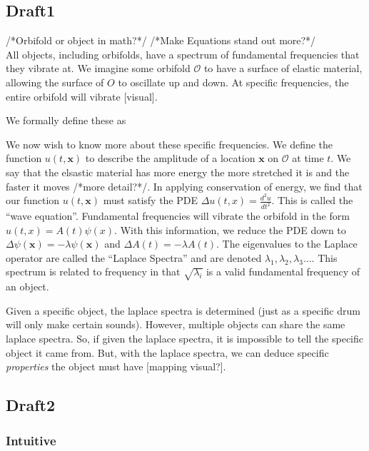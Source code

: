 \documentclass{article}
\begin{document}
\subsection{Draft1}
/*Orbifold or object in math?*/
/*Make Equations stand out more?*/
\\
All objects, including orbifolds, have a spectrum of fundamental frequencies that they vibrate at. We imagine some orbifold $\mathcal{O}$ to have a surface of elastic material, allowing the surface of $O$ to oscillate up and down. At specific frequencies, the entire orbifold will vibrate [visual]. 

We formally define these as 

We now wish to know more about these specific frequencies. We define the function $u(t,\mathbf{x})$ to describe the amplitude of a location $\mathbf{x}$ on $\mathcal{O}$ at time $t$. We say that the elsastic material has more energy the more stretched it is and the faster it moves /*more detail?*/. In applying conservation of energy, we find that our function $u(t,\mathbf{x})$ must satisfy the PDE $\Delta u(t,x) = \frac{d^2u}{dt^2}$. This is called the ``wave equation''. Fundamental frequencies will vibrate the orbifold in the form $u(t,x) = A(t)\psi(x)$. With this information, we reduce the PDE down to $\Delta \psi(\mathbf{x}) = -\lambda \psi(\mathbf{x})$ and $\Delta A(t) = -\lambda A(t)$. The eigenvalues to the Laplace operator are called the ``Laplace Spectra'' and are denoted $\lambda_1, \lambda_2, \lambda_3 \dots$. This spectrum is related to frequency in that $\sqrt{\lambda_i}$ is a valid fundamental frequency of an object.

Given a specific object, the laplace spectra is determined (just as a specific drum will only make certain sounds). However, multiple objects can share the same laplace spectra. So, if given the laplace spectra, it is impossible to tell the specific object it came from. But, with the laplace spectra, we can deduce specific \emph{properties} the object must have [mapping visual?]. 

\subsection{Draft2}
\subsubsection{Intuitive}
\end{document}
